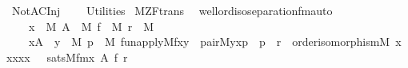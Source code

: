 %
\begin{isabellebody}%
%
%
\isadelimtheory
%
\endisadelimtheory
%
\isatagtheory
{}\isamarkupfalse%
\ NotAC{\isacharunderscore}{\kern0pt}Inj\ \isanewline
\ \ \ Utilities\isanewline
{}%
\endisatagtheory
{\isafoldtheory}%
%
\isadelimtheory
\isanewline
%
\endisadelimtheory
\isanewline
{}\isamarkupfalse%
\ M{\isacharunderscore}{\kern0pt}ZF{\isacharunderscore}{\kern0pt}trans\ \isanewline
\isanewline
\isanewline
{}\isamarkupfalse%
\ well{\isacharunderscore}{\kern0pt}ord{\isacharunderscore}{\kern0pt}iso{\isacharunderscore}{\kern0pt}separation{\isacharunderscore}{\kern0pt}fm{\isacharunderscore}{\kern0pt}auto{\isacharcolon}{\kern0pt}\isanewline
\ \ \isanewline
\ \ \ \ {\isachardoublequoteopen}x\ {\isasymin}\ M{\isachardoublequoteclose}\ {\isachardoublequoteopen}A\ {\isasymin}\ M{\isachardoublequoteclose}\ {\isachardoublequoteopen}f\ {\isasymin}\ M{\isachardoublequoteclose}\ {\isachardoublequoteopen}r\ {\isasymin}\ M{\isachardoublequoteclose}\ \isanewline
\ \ \isanewline
\ \ \ \ {\isachardoublequoteopen}{\isacharparenleft}{\kern0pt}x{\isasymin}A\ {\isasymlongrightarrow}\ {\isacharparenleft}{\kern0pt}{\isasymexists}y\ {\isasymin}\ M{\isachardot}{\kern0pt}\ {\isacharparenleft}{\kern0pt}{\isasymexists}p\ {\isasymin}\ M{\isachardot}{\kern0pt}\ fun{\isacharunderscore}{\kern0pt}apply{\isacharparenleft}{\kern0pt}{\isacharhash}{\kern0pt}{\isacharhash}{\kern0pt}M{\isacharcomma}{\kern0pt}f{\isacharcomma}{\kern0pt}x{\isacharcomma}{\kern0pt}y{\isacharparenright}{\kern0pt}\ {\isasymand}\ pair{\isacharparenleft}{\kern0pt}{\isacharhash}{\kern0pt}{\isacharhash}{\kern0pt}M{\isacharcomma}{\kern0pt}y{\isacharcomma}{\kern0pt}x{\isacharcomma}{\kern0pt}p{\isacharparenright}{\kern0pt}\ {\isasymand}\ p\ {\isasymin}\ r{\isacharparenright}{\kern0pt}{\isacharparenright}{\kern0pt}\ {\isasymand}\ order{\isacharunderscore}{\kern0pt}isomorphism{\isacharparenleft}{\kern0pt}{\isacharhash}{\kern0pt}{\isacharhash}{\kern0pt}M{\isacharcomma}{\kern0pt}\ x{\isacharcomma}{\kern0pt}\ x{\isacharcomma}{\kern0pt}x{\isacharcomma}{\kern0pt}x{\isacharcomma}{\kern0pt}x{\isacharparenright}{\kern0pt}\ {\isacharparenright}{\kern0pt}\ {\isasymlongleftrightarrow}\ sats{\isacharparenleft}{\kern0pt}M{\isacharcomma}{\kern0pt}{\isacharquery}{\kern0pt}fm{\isacharcomma}{\kern0pt}{\isacharbrackleft}{\kern0pt}x{\isacharcomma}{\kern0pt}\ A{\isacharcomma}{\kern0pt}\ f{\isacharcomma}{\kern0pt}\ r{\isacharbrackright}{\kern0pt}{\isacharparenright}{\kern0pt}{\isachardoublequoteclose}\ \isanewline

\end{isabellebody}
